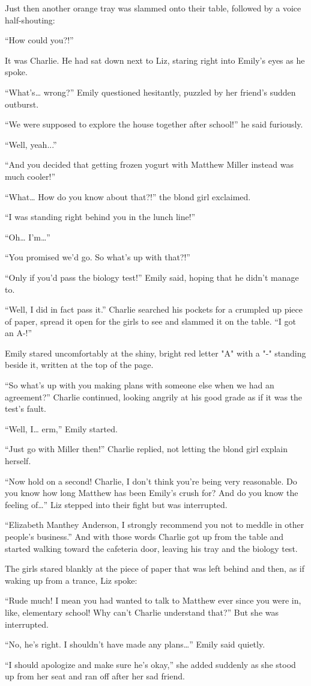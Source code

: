 Just then another orange tray was slammed onto their table, followed by a voice half-shouting:

“How could you?!”

It was Charlie. He had sat down next to Liz, staring right into Emily’s eyes as he spoke.

“What’s… wrong?” Emily questioned hesitantly, puzzled by her friend’s sudden outburst.

“We were supposed to explore the house together after school!” he said furiously.

“Well, yeah...”

“And you decided that getting frozen yogurt with Matthew Miller instead was much cooler!”

“What… How do you know about that?!” the blond girl exclaimed.

“I was standing right behind you in the lunch line!”

“Oh… I’m…”

“You promised we’d go. So what’s up with that?!”

“Only if you’d pass the biology test!” Emily said, hoping that he didn’t manage to.

“Well, I did in fact pass it.” Charlie searched his pockets for a crumpled up piece of paper, spread it open for the girls to see and slammed it on the table. “I got an A-!”

Emily stared uncomfortably at the shiny, bright red letter "A" with a "-" standing beside it, written at the top of the page.

“So what’s up with you making plans with someone else when we had an agreement?” Charlie continued, looking angrily at his good grade as if it was the test’s fault.

“Well, I… erm,” Emily started.

“Just go with Miller then!” Charlie replied, not letting the blond girl explain herself.

“Now hold on a second! Charlie, I don’t think you’re being very reasonable. Do you know how long Matthew has been Emily’s crush for? And do you know the feeling of…” Liz stepped into their fight but was interrupted.

“Elizabeth Manthey Anderson, I strongly recommend you not to meddle in other people’s business.” And with those words Charlie got up from the table and started walking toward the cafeteria door, leaving his tray and the biology test.

The girls stared blankly at the piece of paper that was left behind and then, as if waking up from a trance, Liz spoke:

“Rude much! I mean you had wanted to talk to Matthew ever since you were in, like, elementary school! Why can’t Charlie understand that?” But she was interrupted.

“No, he’s right. I shouldn’t have made any plans…” Emily said quietly.

“I should apologize and make sure he’s okay,” she added suddenly as she stood up from her seat and ran off after her sad friend.